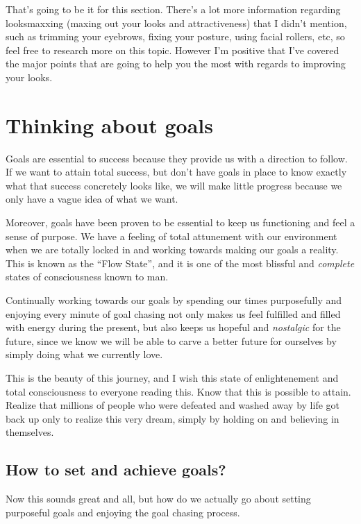 \documentclass[
]{book}
\begin{document}
That's going to be it for this section. There's a lot more information regarding looksmaxxing (maxing out your looks and attractiveness) that I didn't mention, such as trimming your eyebrows, fixing your posture, using facial rollers, etc, so feel free to research more on this topic. However I'm positive that I've covered the major points that are going to help you the most with regards to improving your looks.

\hypertarget{thinking-about-goals}{%
\chapter{Thinking about goals}\label{thinking-about-goals}}

Goals are essential to success because they provide us with a direction to follow. If we want to attain total success, but don't have goals in place to know exactly what that success concretely looks like, we will make little progress because we only have a vague idea of what we want.

Moreover, goals have been proven to be essential to keep us functioning and feel a sense of purpose. We have a feeling of total attunement with our environment when we are totally locked in and working towards making our goals a reality. This is known as the ``Flow State'', and it is one of the most blissful and \emph{complete} states of consciousness known to man.

Continually working towards our goals by spending our times purposefully and enjoying every minute of goal chasing not only makes us feel fulfilled and filled with energy during the present, but also keeps us hopeful and \emph{nostalgic} for the future, since we know we will be able to carve a better future for ourselves by simply doing what we currently love.

This is the beauty of this journey, and I wish this state of enlightenement and total consciousness to everyone reading this. Know that this is possible to attain. Realize that millions of people who were defeated and washed away by life got back up only to realize this very dream, simply by holding on and believing in themselves.

\hypertarget{how-to-set-and-achieve-goals}{%
\section{How to set and achieve goals?}\label{how-to-set-and-achieve-goals}}

Now this sounds great and all, but how do we actually go about setting purposeful goals and enjoying the goal chasing process.
\end{document}
